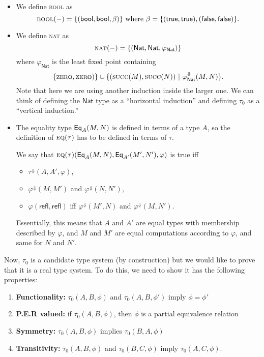 \documentclass{article} \usepackage{chtt-notes} \usepackage{stmaryrd}
\begin{document}
\begin{itemize}
  \item We define \textsc{bool} as \[\textsc{bool}(-) = \{(\mathsf{bool}, \mathsf{bool}, \beta)\} \text{ where } \beta =
  \{(\mathsf{true}, \mathsf{true}), (\mathsf{false}, \mathsf{false})\}.\]

  \item We define \textsc{nat} as \[\textsc{nat}(-) = \{(\textsf{Nat}, \textsf{Nat}, \varphi_{\textsf{Nat}})\}\] where
    $\varphi_\textsf{Nat}$ is the least fixed point containing
    \[ \{\textsc{zero}, \textsc{zero})\} \cup \{(\textsc{succ}(M), \textsc{succ}(N)) ~|~
    \varphi_\textsf{Nat}^\Downarrow(M, N) \}. \]
    Note that here we are using another induction inside the larger one. We can think of
    defining the $\textsf{Nat}$ type as a ``horizontal induction'' and defining $\tau_0$
    as a ``vertical induction.''

  \item The equality type $\mathsf{Eq}_{A}(M,N)$ is defined in terms of a type $A$, so the definition
      of $\textsc{eq}(\tau)$ has to be defined in terms of $\tau$.
      
      We say that $\textsc{eq}(\tau)(\mathsf{Eq}_{A}(M,N), \mathsf{Eq}_{A'}(M',N'), \varphi)$ is true iff
      \begin{itemize}
      \item $\tau^\Downarrow(A, A', \varphi)$,
      \item $\varphi^\Downarrow(M,M')$ and $\varphi^\Downarrow(N,N')$,
      \item $\varphi(\textsf{refl}, \textsf{refl})$ iff $\varphi^\Downarrow(M',N)$ and
          $\varphi^\Downarrow(M,N')$.
      \end{itemize}

      Essentially, this means that $A$ and $A'$ are equal types with membership
      described by $\varphi$, and $M$ and $M'$ are equal computations according to
      $\varphi$, and same for $N$ and $N'$.

\end{itemize}

Now, $\tau_0$ is a candidate type system (by construction) but we would like to prove that
it is a real type system. To do this, we need to show it has the following properties:

\begin{enumerate}
\item \textbf{Functionality:} $\tau_0(A, B, \phi)$ and
  $\tau_0(A, B, \phi')$ imply $\phi = \phi'$
\item \textbf{\textsc{P.E.R} valued:} if $\tau_0(A, B, \phi)$, then
  $\phi$ is a partial equivalence relation
\item \textbf{Symmetry:} $\tau_0(A, B, \phi)$ implies $\tau_0(B, A, \phi)$
\item \textbf{Transitivity:} $\tau_0(A, B, \phi)$ and $\tau_0(B, C, \phi)$
  imply $\tau_0(A, C, \phi)$.
\end{enumerate}
\end{document}
